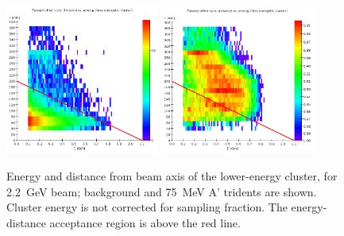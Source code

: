 \begin{figure}[ht]
	\includegraphics[width=0.45\textwidth]{performance/trigger/energy-distance_22}
	\includegraphics[width=0.45\textwidth]{performance/trigger/energy-distance_22_075mev}
	\caption{\small{Energy and distance from beam axis of the lower-energy cluster, for 2.2~GeV beam; background and 75~MeV A' tridents are shown. Cluster energy is not corrected for sampling fraction. The energy-distance acceptance region is above the red line.}}
	\label{fig:energy-distance}
\end{figure}

